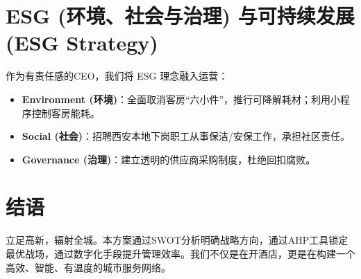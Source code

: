 \documentclass{cumcmthesis}
\begin{document}
\section{ESG (环境、社会与治理) 与可持续发展 (ESG Strategy)}

作为有责任感的CEO，我们将 ESG 理念融入运营：
\begin{itemize}
    \item \textbf{Environment (环境)}：全面取消客房“六小件”，推行可降解耗材；利用小程序控制客房能耗。
    \item \textbf{Social (社会)}：招聘西安本地下岗职工从事保洁/安保工作，承担社区责任。
    \item \textbf{Governance (治理)}：建立透明的供应商采购制度，杜绝回扣腐败。
\end{itemize}

\section{结语}
立足高新，辐射全城。本方案通过SWOT分析明确战略方向，通过AHP工具锁定最优战场，通过数字化手段提升管理效率。我们不仅是在开酒店，更是在构建一个高效、智能、有温度的城市服务网络。
\end{document}
